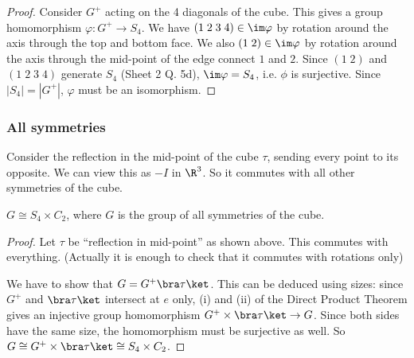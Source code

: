\documentclass[a4paper]{article}
\begin{document}
  \begin{proof}
    Consider $G^+$ acting on the 4 diagonals of the cube. This gives a group homomorphism $\varphi: G^+ \to S_4$. We have $(1\; 2\; 3\; 4)\in\im \varphi$ by rotation around the axis through the top and bottom face. We also $(1\; 2)\in \im \varphi$ by rotation around the axis through the mid-point of the edge connect $1$ and $2$. Since $(1\; 2)$ and $(1\; 2\; 3\; 4)$ generate $S_4$ (Sheet 2 Q. 5d), $\im\varphi = S_4$, i.e. $\phi$ is surjective. Since $|S_4| = |G^+|$, $\varphi$ must be an isomorphism.
  \end{proof}

  \subsubsection{All symmetries}
  Consider the reflection in the mid-point of the cube $\tau$, sending every point to its opposite. We can view this as $-I$ in $\R^3$. So it commutes with all other symmetries of the cube.
  \begin{prop}
    $G \cong S_4\times C_2$, where $G$ is the group of all symmetries of the cube.
  \end{prop}

  \begin{proof}
    Let $\tau$ be ``reflection in mid-point'' as shown above. This commutes with everything. (Actually it is enough to check that it commutes with rotations only)

    We have to show that $G = G^+\bra \tau\ket$. This can be deduced using sizes: since $G^+$ and $\bra\tau\ket$ intersect at $e$ only, (i) and (ii) of the Direct Product Theorem gives an injective group homomorphism $G^+\times \bra\tau\ket \to G$. Since both sides have the same size, the homomorphism must be surjective as well. So $G\cong G^+\times \bra \tau\ket \cong S_4\times C_2$. 
  \end{proof}
\end{document}
